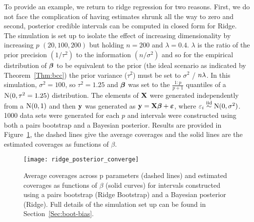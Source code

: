 
To provide an example, we return to ridge regression for two reasons. First, we do not face the complication of having estimates shrunk all the way to zero and second, posterior credible intervals can be computed in closed form for Ridge. The simulation is set up to isolate the effect of increasing dimensionality by increasing $p$ $(20, 100, 200)$ but holding $n = 200$ and $\lambda = 0.4$. $\lambda$ is the ratio of the prior precision $(1/\tau^2)$ to the information $(n / \sigma^2)$ and so for the empirical distribution of $\boldsymbol{\beta}$ to be equivalent to the prior (the ideal scenario as indicated by Theorem~\ref{Thm:bcc}) the prior variance ($\tau^2$) must be set to $\sigma^2$ / $n\lambda$. In this simulation, $\sigma^2 = 100$, so $\tau^2 = 1.25$ and $\boldsymbol{\beta}$ was set to the $\frac{1:p}{p+1}$ quantiles of a $\textrm{N}(0,\tau^2=1.25)$ distribution. The elements of $\mathbf{X}$ were generated independently from a $\textrm{N}(0, 1)$ and then $\mathbf{y}$ was generated as $\mathbf{y} = \mathbf{X}\boldsymbol{\beta} + \boldsymbol{\varepsilon}$, where $\varepsilon_i \overset{\text{iid}}{\sim} \textrm{N}(0, \sigma^2)$. 1000 data sets were generated for each $p$ and intervals were constructed using both a pairs bootstrap and a Bayesian posterior. Results are provided in Figure~\ref{Fig:ridge_converge}, the dashed lines give the average coverages and the solid lines are the estimated coverages as functions of $\beta$. 

\begin{figure}[htb!]
  \begin{center}
  \texttt{[image: ridge\_posterior\_converge]}
  \caption{\label{Fig:ridge_converge} Average coverages across p parameters (dashed lines) and estimated coverages as functions of $\beta$ (solid curves) for intervals constructed using a pairs bootstrap (Ridge Bootstrap) and a Bayesian posterior (Ridge). Full details of the simulation set up can be found in Section~\ref{Sec:boot-bias}.}
  \end{center}
\end{figure}

